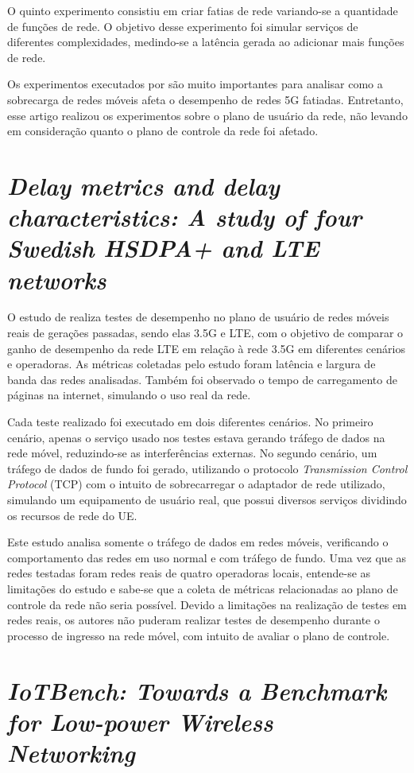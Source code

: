 O quinto experimento consistiu em criar fatias de rede variando-se a quantidade de funções de rede.
O objetivo desse experimento foi simular serviços de diferentes complexidades, medindo-se a latência gerada ao adicionar mais funções de rede.

Os experimentos executados por  são muito importantes para analisar como a sobrecarga de redes móveis afeta o desempenho de redes 5G fatiadas.
Entretanto, esse artigo realizou os experimentos sobre o plano de usuário da rede, não levando em consideração quanto o plano de controle da rede foi afetado.

\section{\textit{Delay metrics and delay characteristics: A study of four Swedish HSDPA+ and LTE networks}}

O estudo de  realiza testes de desempenho no plano de usuário de redes móveis reais de gerações passadas, sendo elas 3.5G e LTE, com o objetivo de comparar o ganho de desempenho da rede LTE em relação à rede 3.5G em diferentes cenários e operadoras.
As métricas coletadas pelo estudo foram latência e largura de banda das redes analisadas.
Também foi observado o tempo de carregamento de páginas na internet, simulando o uso real da rede.

Cada teste realizado foi executado em dois diferentes cenários.
No primeiro cenário, apenas o serviço usado nos testes estava gerando tráfego de dados na rede móvel, reduzindo-se as interferências externas.
No segundo cenário, um tráfego de dados de fundo foi gerado, utilizando o protocolo \textit{Transmission Control Protocol} (TCP) com o intuito de sobrecarregar o adaptador de rede utilizado, simulando um equipamento de usuário real, que possui diversos serviços dividindo os recursos de rede do UE.

Este estudo analisa somente o tráfego de dados em redes móveis, verificando o comportamento das redes em uso normal e com tráfego de fundo.
Uma vez que as redes testadas foram redes reais de quatro operadoras locais, entende-se as limitações do estudo e sabe-se que a coleta de métricas relacionadas ao plano de controle da rede não seria possível.
Devido a limitações na realização de testes em redes reais, os autores não puderam realizar testes de desempenho durante o processo de ingresso na rede móvel, com intuito de avaliar o plano de controle.

\section{\textit{IoTBench: Towards a Benchmark for Low-power Wireless Networking}}

